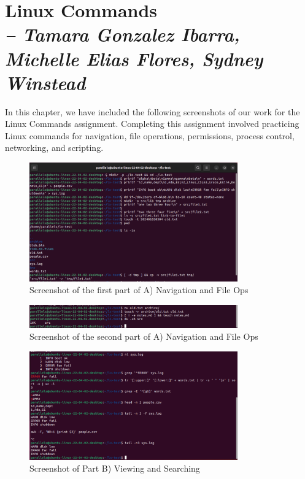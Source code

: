 \chapter{Linux Commands \\
\small{\textit{-- Tamara Gonzalez Ibarra, Michelle Elias Flores, Sydney Winstead}}
\label{Chapter::itLinuxCommands}}

In this chapter, we have included the following screenshots of our work for the Linux Commands assignment. Completing this assignment involved practicing Linux commands for navigation, file operations, permissions, process control, networking, and scripting. 


\begin{figure}[h!]
    \centering
    \includegraphics[width=0.8\textwidth]{linuxptA.png}
    \caption{Screenshot of the first part of A) Navigation and File Ops}
    \label{fig:problemsetA}
\end{figure}
    
\begin{figure}[h!]
    \centering
    \includegraphics[width=0.8\textwidth]{linuxptA2.png}
    \caption{Screenshot of the second part of A) Navigation and File Ops}
    \label{fig:problemsetApt2}
\end{figure}

\begin{figure}[h!]
    \centering
    \includegraphics[width=0.8\textwidth]{linuxptB.png}
    \caption{Screenshot of Part B) Viewing and Searching}
    \label{fig:problemsetB}

\end{figure}

